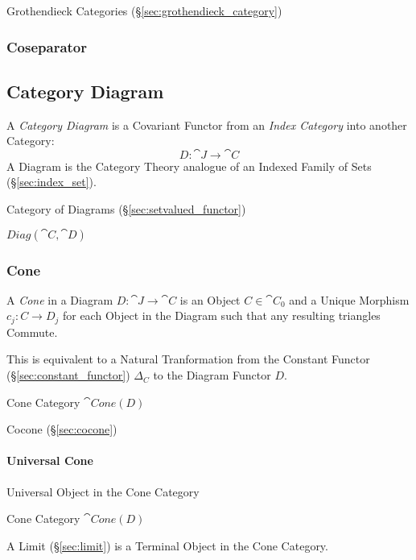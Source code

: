 Grothendieck Categories (\S\ref{sec:grothendieck_category})



\subsubsection{Coseparator}\label{sec:coseparator}



\subsection{Category Diagram}\label{sec:category_diagram}

A \emph{Category Diagram} is a Covariant Functor from an \emph{Index
  Category} into another Category:
\[
  D : \cat{J} \rightarrow \cat{C}
\]
A Diagram is the Category Theory analogue of an Indexed Family of Sets
(\S\ref{sec:index_set}).

Category of Diagrams (\S\ref{sec:setvalued_functor})

$Diag(\cat{C},\cat{D})$



\subsubsection{Cone}\label{sec:category_cone}

A \emph{Cone} in a Diagram $D : \cat{J} \rightarrow \cat{C}$ is
an Object $C \in \cat{C}_0$ and a Unique Morphism $c_j : C
\rightarrow D_j$ for each Object in the Diagram such that any
resulting triangles Commute.

This is equivalent to a Natural Tranformation from the Constant
Functor (\S\ref{sec:constant_functor}) $\Delta_C$ to the Diagram
Functor $D$.

Cone Category $\cat{Cone}(D)$

Cocone (\S\ref{sec:cocone})



\paragraph{Universal Cone}\label{sec:universal_cone}\hfill

Universal Object in the Cone Category

Cone Category $\cat{Cone}(D)$

A Limit (\S\ref{sec:limit}) is a Terminal Object in the Cone
Category.



